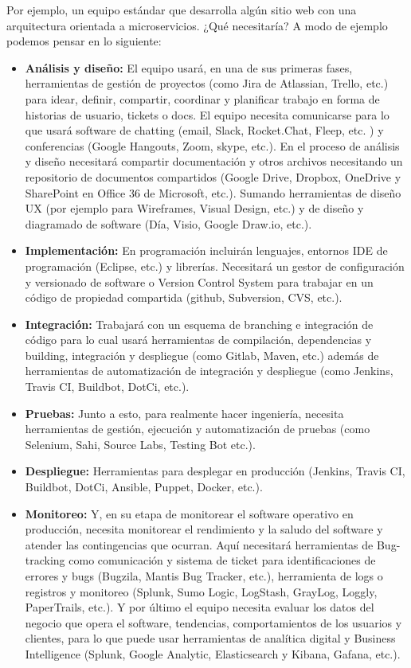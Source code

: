 Por ejemplo, un equipo estándar que desarrolla algún sitio web con una arquitectura orientada a microservicios. ¿Qué necesitaría? A modo de ejemplo podemos pensar en lo siguiente:
\begin{itemize}

\item \textbf{Análisis y diseño:} El equipo usará, en una de sus primeras fases, herramientas de gestión de proyectos (como Jira de Atlassian, Trello, etc.) para idear, definir, compartir, coordinar y planificar trabajo en forma de historias de usuario, tickets o docs. El equipo necesita comunicarse para lo que usará software de chatting (email, Slack, Rocket.Chat, Fleep, etc. ) y conferencias (Google Hangouts, Zoom, skype, etc.). En el proceso de análisis y diseño necesitará compartir documentación y otros archivos necesitando un repositorio de documentos compartidos (Google Drive, Dropbox, OneDrive y SharePoint en Office 36 de Microsoft, etc.). Sumando herramientas de diseño UX (por ejemplo para Wireframes, Visual Design, etc.) y de diseño y diagramado de software (Día, Visio, Google Draw.io, etc.). 

\item \textbf{Implementación:} En programación incluirán lenguajes, entornos IDE de programación (Eclipse, etc.) y librerías. Necesitará un gestor de configuración y versionado de software o Version Control System para trabajar en un código de propiedad compartida (github, Subversion, CVS, etc.). 

\item \textbf{Integración:} Trabajará con un esquema de branching e integración de código para lo cual usará herramientas de compilación, dependencias y building, integración y despliegue (como Gitlab, Maven, etc.) además de herramientas de automatización de integración y despliegue (como Jenkins, Travis CI, Buildbot, DotCi, etc.). 

\item \textbf{Pruebas:} Junto a esto, para realmente hacer ingeniería, necesita herramientas de gestión, ejecución y automatización de pruebas (como Selenium, Sahi, Source Labs, Testing Bot etc.). 

\item \textbf{Despliegue:} Herramientas para desplegar en producción (Jenkins, Travis CI, Buildbot, DotCi, Ansible, Puppet, Docker, etc.). 

\item \textbf{Monitoreo:} Y, en su etapa de monitorear el software operativo en producción, necesita monitorear el rendimiento y la saludo del software y atender las contingencias que ocurran. Aquí necesitará herramientas de Bug-tracking como comunicación y sistema de ticket para identificaciones de errores y bugs (Bugzila, Mantis Bug Tracker, etc.), herramienta de logs o  registros y monitoreo (Splunk, Sumo Logic, LogStash, GrayLog, Loggly, PaperTrails, etc.). Y por último el equipo necesita evaluar los datos del negocio que opera el software, tendencias, comportamientos de los usuarios y clientes, para lo que puede usar herramientas de analítica digital y Business Intelligence (Splunk, Google Analytic, Elasticsearch y Kibana, Gafana, etc.).

\end{itemize}

